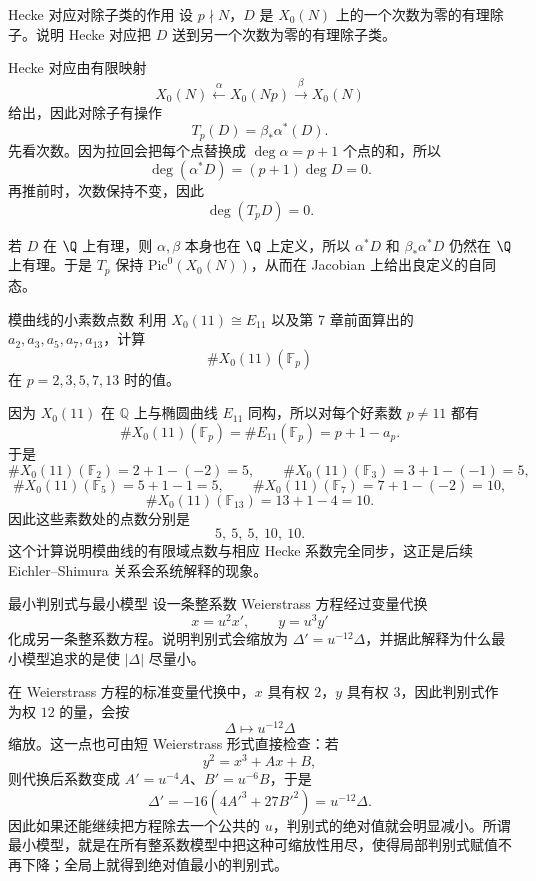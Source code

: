 \begin{problem}{Hecke 对应对除子类的作用}
\hard
设 $p\nmid N$，$D$ 是 $X_0(N)$ 上的一个次数为零的有理除子。说明 Hecke 对应把 $D$ 送到另一个次数为零的有理除子类。
\end{problem}
\begin{solution}
Hecke 对应由有限映射
\[
X_0(N) \xleftarrow{\ \alpha\ } X_0(Np) \xrightarrow{\ \beta\ } X_0(N)
\]
给出，因此对除子有操作
\[
T_p(D)=\beta_*\alpha^*(D).
\]
先看次数。因为拉回会把每个点替换成 $\deg\alpha=p+1$ 个点的和，所以
\[
\deg(\alpha^*D)=(p+1)\deg D=0.
\]
再推前时，次数保持不变，因此
\[
\deg(T_pD)=0.
\]

若 $D$ 在 $\Q$ 上有理，则 $\alpha,\beta$ 本身也在 $\Q$ 上定义，所以 $\alpha^*D$ 和 $\beta_*\alpha^*D$ 仍然在 $\Q$ 上有理。于是 $T_p$ 保持 $\mathrm{Pic}^0(X_0(N))$，从而在 Jacobian 上给出良定义的自同态。
\end{solution}

\begin{problem}{模曲线的小素数点数}
\hard
利用 $X_0(11)\cong E_{11}$ 以及第 7 章前面算出的 $a_2,a_3,a_5,a_7,a_{13}$，计算
\[
\#X_0(11)(\mathbb{F}_p)
\]
在 $p=2,3,5,7,13$ 时的值。
\end{problem}
\begin{solution}
因为 $X_0(11)$ 在 $\mathbb{Q}$ 上与椭圆曲线 $E_{11}$ 同构，所以对每个好素数 $p\ne 11$ 都有
\[
\#X_0(11)(\mathbb{F}_p)=\#E_{11}(\mathbb{F}_p)=p+1-a_p.
\]
于是
\[
\#X_0(11)(\mathbb{F}_2)=2+1-(-2)=5,
\qquad
\#X_0(11)(\mathbb{F}_3)=3+1-(-1)=5,
\]
\[
\#X_0(11)(\mathbb{F}_5)=5+1-1=5,
\qquad
\#X_0(11)(\mathbb{F}_7)=7+1-(-2)=10,
\]
\[
\#X_0(11)(\mathbb{F}_{13})=13+1-4=10.
\]
因此这些素数处的点数分别是
\[
5,\ 5,\ 5,\ 10,\ 10.
\]
这个计算说明模曲线的有限域点数与相应 Hecke 系数完全同步，这正是后续 Eichler--Shimura 关系会系统解释的现象。
\end{solution}

\begin{problem}{最小判别式与最小模型}
\hard
设一条整系数 Weierstrass 方程经过变量代换
\[
x=u^2x',\qquad y=u^3y'
\]
化成另一条整系数方程。说明判别式会缩放为 $\Delta'=u^{-12}\Delta$，并据此解释为什么最小模型追求的是使 $|\Delta|$ 尽量小。
\end{problem}
\begin{solution}
在 Weierstrass 方程的标准变量代换中，$x$ 具有权 $2$，$y$ 具有权 $3$，因此判别式作为权 $12$ 的量，会按
\[
\Delta\longmapsto u^{-12}\Delta
\]
缩放。这一点也可由短 Weierstrass 形式直接检查：若
\[
y^2=x^3+Ax+B,
\]
则代换后系数变成 $A'=u^{-4}A$、$B'=u^{-6}B$，于是
\[
\Delta'=-16(4A'^3+27B'^2)=u^{-12}\Delta.
\]
因此如果还能继续把方程除去一个公共的 $u$，判别式的绝对值就会明显减小。所谓最小模型，就是在所有整系数模型中把这种可缩放性用尽，使得局部判别式赋值不再下降；全局上就得到绝对值最小的判别式。
\end{solution}


